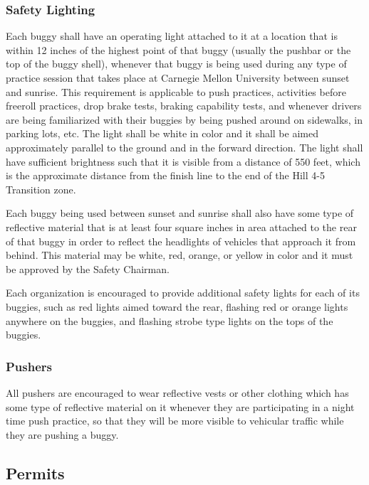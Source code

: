 \subsubsection{Safety Lighting}

	Each buggy shall have an operating light attached to it at a location that is
	within 12 inches of the highest point of that buggy (usually the pushbar or the
	top of the buggy shell), whenever that buggy is being used during any type of
	practice session that takes place at Carnegie Mellon University between sunset
	and sunrise. This requirement is applicable to push practices, activities
	before freeroll practices, drop brake tests, braking capability tests, and
	whenever drivers are being familiarized with their buggies by being pushed
	around on sidewalks, in parking lots, etc. The light shall be white in color
	and it shall be aimed approximately parallel to the ground and in the forward
	direction. The light shall have sufficient brightness such that it is visible
	from a distance of 550 feet, which is the approximate distance from the finish
	line to the end of the Hill 4-5 Transition zone.

	Each buggy being used between sunset and sunrise shall also have some type of
	reflective material that is at least four square inches in area attached to the
	rear of that buggy in order to reflect the headlights of vehicles that approach
	it from behind. This material may be white, red, orange, or yellow in color and
	it must be approved by the Safety Chairman.

	Each organization is encouraged to provide additional safety lights for each of
	its buggies, such as red lights aimed toward the rear, flashing red or orange
	lights anywhere on the buggies, and flashing strobe type lights on the tops of
	the buggies.

\subsubsection{Pushers}

	All pushers are encouraged to wear reflective vests or other clothing which has
	some type of reflective material on it whenever they are participating in a
	night time push practice, so that they will be more visible to vehicular
	traffic while they are pushing a buggy.

\subsection{Permits}

